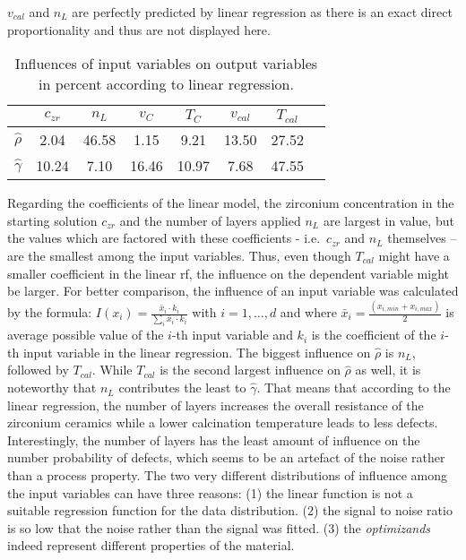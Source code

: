 $v_{cal}$ and $n_L$ are perfectly predicted by linear regression as there is an exact direct proportionality and thus are not displayed here. 
%
\begin{table}[htb]
	\center
	\begin{tabular}{cccccccc}
		        & $c_{zr}$      & $n_L$     & $v_{C}$      & $T_{C}$      & $v_{cal}$     & $T_{cal}$\\
				\hline\hline
				$\hat\rho$          &2.04   &46.58  &1.15   &9.21   &13.50  &27.52\\
				$\hat\gamma$        &10.24  &7.10   &16.46  &10.97  &7.68   &47.55\\
				\hline\hline
	\end{tabular}
	\label{tab:lin-reg-influence}
	\caption{Influences of input variables on output variables in percent according to linear regression.}
\end{table}

%
Regarding the coefficients of the linear model, the zirconium concentration in the starting solution $c_{zr}$ and the number of layers applied $n_L$ are largest in value, but the values which are factored with these coefficients - i.e.\, $c_{zr}$ and $n_L$ themselves -- are the smallest among the input variables. 
Thus, even though $T_{cal}$ might have a smaller coefficient in the linear \gls{rf}, the influence on the dependent variable might be larger. 
For better comparison, the influence of an input variable was calculated by the formula: $I(x_i)=\frac{\bar{x}_i \cdot k_i}{\sum_i \bar{x}_i \cdot k_i}$ with $i=1,\dots,d $ and where $\bar{x}_i= \frac{(x_{i,min}+x_{i,max})}{2}$ is average possible value of the $i$-th input variable and $k_i$ is the coefficient of the $i$-th input variable in the linear regression. 
The biggest influence on $\hat\rho$ is  $n_L$, followed by $T_{cal}$. 
While $T_{cal}$ is the second largest influence on $\hat\rho$ as well, it is noteworthy that $n_L$ contributes the least to $\hat\gamma$. 
That means that according to the linear regression, the number of layers increases the overall resistance of the zirconium ceramics while a lower calcination temperature leads to less defects. 
Interestingly, the number of layers has the least amount of influence on the number probability of defects, which seems to be an artefact of the noise rather than a process property. 
The two very different distributions of influence among the input variables can have three reasons:
(1) the linear function is not a suitable regression function for the data distribution.
(2) the signal to noise ratio is so low that the noise rather than the signal was fitted.
(3) the \textit{optimizands} indeed represent different properties of the material.
%


